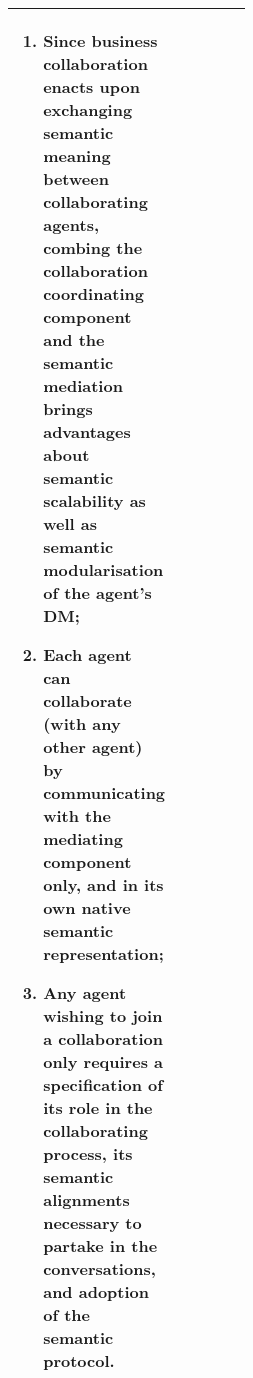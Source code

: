\begin{xltabular}[l]{\linewidth}{@{} >{\small\raggedright\arraybackslash}p{0.47\linewidth} >{\small\raggedright\arraybackslash}X @{}}
\begin{enumerate}[left=10pt, nosep]
  \item Since business collaboration enacts upon exchanging semantic meaning between collaborating agents, combing the collaboration coordinating component and the semantic mediation brings advantages about semantic scalability as well as semantic modularisation of the agent's DM;
  \item Each agent can collaborate (with any other agent) by communicating with the mediating component only, and in its own native semantic representation;
  \item Any agent wishing to join a collaboration only requires a specification of its role in the collaborating process, its semantic alignments necessary to partake in the conversations, and adoption of the semantic protocol.
\end{enumerate}\\
%
\bottomrule
\end{xltabular}


